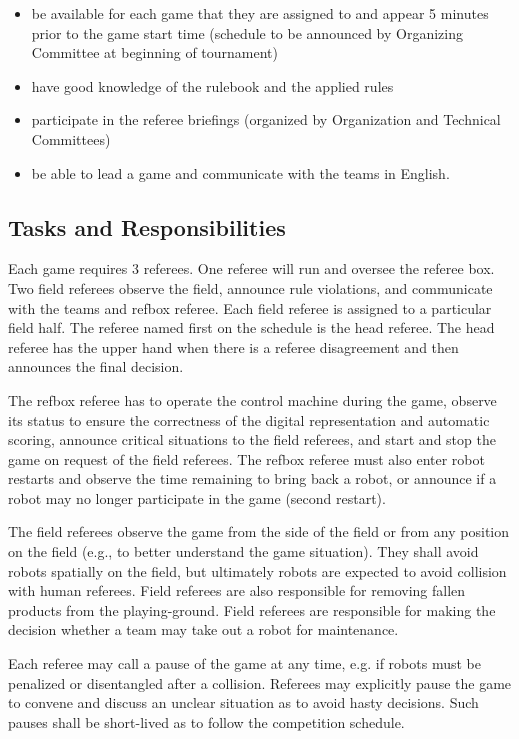 \documentclass[12pt,twoside]{article}
\begin{document}
\begin{itemize}
\item be available for each game that they are assigned to and appear
  5 minutes prior to the game start time (schedule to be announced by
  Organizing Committee at beginning of tournament)
\item have good knowledge of the rulebook and the applied rules
\item participate in the referee briefings (organized by Organization
  and Technical Committees)
\item be able to lead a game and communicate with the teams in
  English.
\end{itemize}

\subsection{Tasks and Responsibilities}
Each game requires 3 referees. One referee will run and oversee the
referee box. Two field referees observe the field, announce rule
violations, and communicate with the teams and refbox referee. Each
field referee is assigned to a particular field half. The referee
named first on the schedule is the head referee. The head referee has
the upper hand when there is a referee disagreement and then announces
the final decision.

The refbox referee has to operate the control machine during the game,
observe its status to ensure the correctness of the digital
representation and automatic scoring, announce critical situations to
the field referees, and start and stop the game on request of the
field referees. The refbox referee must also enter robot restarts and
observe the time remaining to bring back a robot, or announce if a
robot may no longer participate in the game (second restart).

The field referees observe the game from the side of the field or from
any position on the field (e.g., to better understand the game
situation). They shall avoid robots spatially on the field, but
ultimately robots are expected to avoid collision with human
referees. Field referees are also responsible for removing fallen products
from the playing-ground. Field referees are responsible for making the decision
whether a team may take out a robot for maintenance.

Each referee may call a pause of the game at any time, e.g. if robots
must be penalized or disentangled after a collision. Referees may
explicitly pause the game to convene and discuss an unclear situation
as to avoid hasty decisions. Such pauses shall be short-lived as to
follow the competition schedule. %
\end{document}
